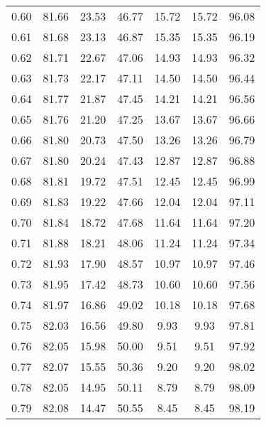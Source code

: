 \begin{tabular}{|c|c|c|c|c|c|c|}
      0.60 &     81.66 &     23.53 &      46.77 &   15.72 &      15.72 &         96.08 \\
      0.61 &     81.68 &     23.13 &      46.87 &   15.35 &      15.35 &         96.19 \\
      0.62 &     81.71 &     22.67 &      47.06 &   14.93 &      14.93 &         96.32 \\
      0.63 &     81.73 &     22.17 &      47.11 &   14.50 &      14.50 &         96.44 \\
      0.64 &     81.77 &     21.87 &      47.45 &   14.21 &      14.21 &         96.56 \\
      0.65 &     81.76 &     21.20 &      47.25 &   13.67 &      13.67 &         96.66 \\
      0.66 &     81.80 &     20.73 &      47.50 &   13.26 &      13.26 &         96.79 \\
      0.67 &     81.80 &     20.24 &      47.43 &   12.87 &      12.87 &         96.88 \\
      0.68 &     81.81 &     19.72 &      47.51 &   12.45 &      12.45 &         96.99 \\
      0.69 &     81.83 &     19.22 &      47.66 &   12.04 &      12.04 &         97.11 \\
      0.70 &     81.84 &     18.72 &      47.68 &   11.64 &      11.64 &         97.20 \\
      0.71 &     81.88 &     18.21 &      48.06 &   11.24 &      11.24 &         97.34 \\
      0.72 &     81.93 &     17.90 &      48.57 &   10.97 &      10.97 &         97.46 \\
      0.73 &     81.95 &     17.42 &      48.73 &   10.60 &      10.60 &         97.56 \\
      0.74 &     81.97 &     16.86 &      49.02 &   10.18 &      10.18 &         97.68 \\
      0.75 &     82.03 &     16.56 &      49.80 &    9.93 &       9.93 &         97.81 \\
      0.76 &     82.05 &     15.98 &      50.00 &    9.51 &       9.51 &         97.92 \\
      0.77 &     82.07 &     15.55 &      50.36 &    9.20 &       9.20 &         98.02 \\
      0.78 &     82.05 &     14.95 &      50.11 &    8.79 &       8.79 &         98.09 \\
      0.79 &     82.08 &     14.47 &      50.55 &    8.45 &       8.45 &         98.19 \\

\end{tabular}
